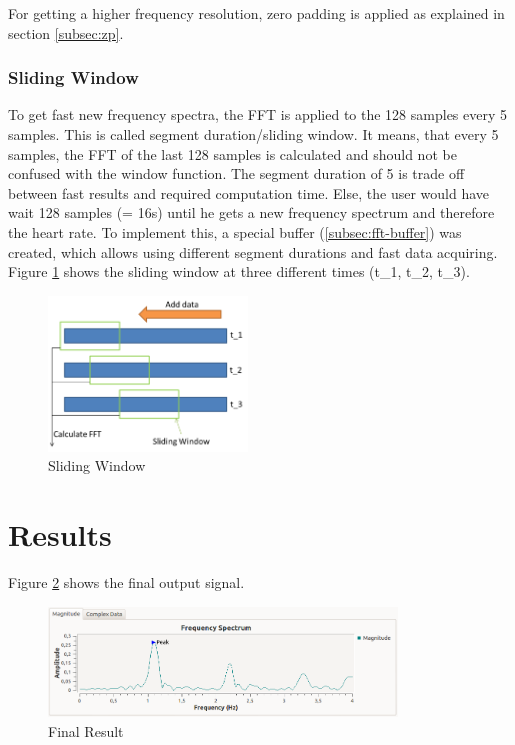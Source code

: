 \documentclass[notitlepage]{scrreprt}
\begin{document}
For getting a higher frequency resolution, zero padding is applied as explained in section \ref{subsec:zp}.

\subsubsection{Sliding Window}
\label{subsubsec:sliding-window}
To get fast new frequency spectra, the FFT is applied to the 128 samples every 5 samples. This is called segment duration/sliding window. It means, that every 5 samples, the FFT of the last 128 samples is calculated and should not be confused with the window function. The segment duration of 5 is trade off between fast results and required computation time. Else, the user would have wait 128 samples (= 16s) until he gets a new frequency spectrum and therefore the heart rate. To implement this, a special buffer (\ref{subsec:fft-buffer}) was created, which allows using different segment durations and fast data acquiring. Figure \ref{fig:sliding-window} shows the sliding window at three different times (t\_1, t\_2, t\_3).

\begin{figure}[H]
	\centering
	\includegraphics[width=200px]{images/slidingWindow.png}
	\caption{Sliding Window}
	\label{fig:sliding-window}
\end{figure}

\section{Results}
Figure \ref{fig:result} shows the final output signal.

\begin{figure}[H]
	\centering
	\includegraphics[width=350px]{images/withEverything.png}
	\caption{Final Result}
	\label{fig:result}
\end{figure}
\end{document}
